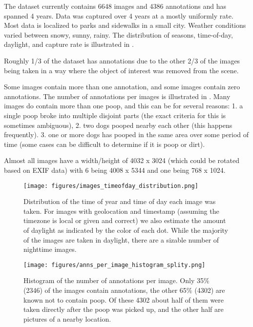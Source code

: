 \documentclass[10pt,twocolumn,letterpaper]{article}
\begin{document}

The dataset currently contains 6648 images and 4386 annotations and has spanned
4 years. Data was captured over 4 years at a mostly uniformly rate.  Most data
is localized to parks and sidewalks in a small city.  Weather conditions varied
between snowy, sunny, rainy.  The distribution of seasons, time-of-day,
daylight, and capture rate is illustrated in .

Roughly 1/3 of the dataset has annotations due to the other 2/3 of the
images being taken in a way where the object of interest was removed from the
scene.

Some images contain more than one annotation, and some images contain zero annotations.
The number of annotations per images is illustrated in .
Many images do contain more than one poop, and this can be for several reasons:
    1. a single poop broke into multiple disjoint parts (the exact criteria for this is sometimes ambiguous), 
    2. two dogs pooped nearby each other (this happens frequently). 
    3. one or more dogs has pooped in the same area over some period of
       time (some cases can be difficult to determine if it is poop or dirt).

Almost all images have a width/height of 4032 x 3024 (which could be rotated
based on EXIF data) with 6 being 4008 x 5344 and one being 768 x 1024.

\begin{figure}[h]
\centering
\texttt{[image: figures/images\_timeofday\_distribution.png]}
\caption[]{
    Distribution of the time of year and time of day each image was taken.
    For images with geolocation and timestamp (assuming the timezone is local
    or given and correct) we also estimate the amount of daylight as indicated
    by the color of each dot. While the majority of the images are taken in
    daylight, there are a sizable number of nighttime images.
}
\label{fig:TimeOfDayDistribution}
\end{figure}


\begin{figure}[h]
\centering
\texttt{[image: figures/anns\_per\_image\_histogram\_splity.png]}
\caption[]{
    Histogram of the number of annotations per image. 
    Only 35\% (2346) of the images contain annotations, the other 65\% (4302)
    are known not to contain poop. Of these 4302 about half of them were taken
    directly after the poop was picked up, and the other half are pictures of a
    nearby location.
}
\label{fig:AnnotsPerImage}
\end{figure}
\end{document}

